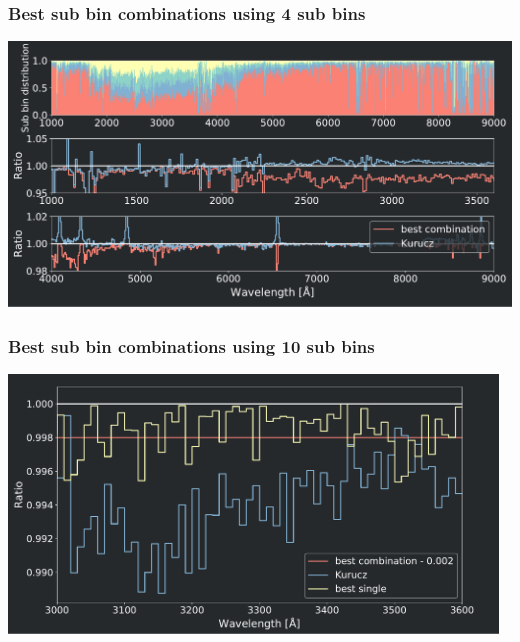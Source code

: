 {
	\centering	
	\frametitle{Best sub bin combinations using 4 sub bins}
	\includegraphics[width=140mm]{images/best_combination_finder_0}
}

\frame
{
	\centering		
	\frametitle{Best sub bin combinations using 10 sub bins}
	\includegraphics[width=130mm]{images/best_combination_finder_10_1}
}


